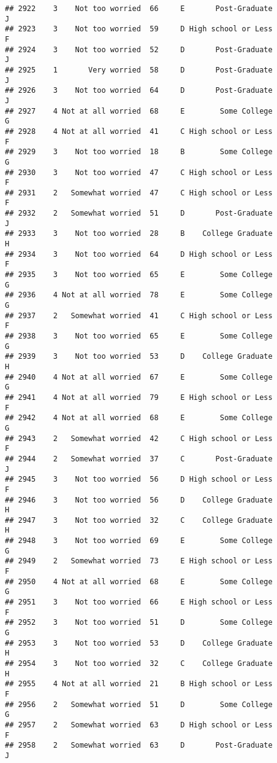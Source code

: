 \documentclass[
]{article}
\begin{document}
\begin{verbatim}
## 2922    3    Not too worried  66     E       Post-Graduate         J
## 2923    3    Not too worried  59     D High school or Less         F
## 2924    3    Not too worried  52     D       Post-Graduate         J
## 2925    1       Very worried  58     D       Post-Graduate         J
## 2926    3    Not too worried  64     D       Post-Graduate         J
## 2927    4 Not at all worried  68     E        Some College         G
## 2928    4 Not at all worried  41     C High school or Less         F
## 2929    3    Not too worried  18     B        Some College         G
## 2930    3    Not too worried  47     C High school or Less         F
## 2931    2   Somewhat worried  47     C High school or Less         F
## 2932    2   Somewhat worried  51     D       Post-Graduate         J
## 2933    3    Not too worried  28     B    College Graduate         H
## 2934    3    Not too worried  64     D High school or Less         F
## 2935    3    Not too worried  65     E        Some College         G
## 2936    4 Not at all worried  78     E        Some College         G
## 2937    2   Somewhat worried  41     C High school or Less         F
## 2938    3    Not too worried  65     E        Some College         G
## 2939    3    Not too worried  53     D    College Graduate         H
## 2940    4 Not at all worried  67     E        Some College         G
## 2941    4 Not at all worried  79     E High school or Less         F
## 2942    4 Not at all worried  68     E        Some College         G
## 2943    2   Somewhat worried  42     C High school or Less         F
## 2944    2   Somewhat worried  37     C       Post-Graduate         J
## 2945    3    Not too worried  56     D High school or Less         F
## 2946    3    Not too worried  56     D    College Graduate         H
## 2947    3    Not too worried  32     C    College Graduate         H
## 2948    3    Not too worried  69     E        Some College         G
## 2949    2   Somewhat worried  73     E High school or Less         F
## 2950    4 Not at all worried  68     E        Some College         G
## 2951    3    Not too worried  66     E High school or Less         F
## 2952    3    Not too worried  51     D        Some College         G
## 2953    3    Not too worried  53     D    College Graduate         H
## 2954    3    Not too worried  32     C    College Graduate         H
## 2955    4 Not at all worried  21     B High school or Less         F
## 2956    2   Somewhat worried  51     D        Some College         G
## 2957    2   Somewhat worried  63     D High school or Less         F
## 2958    2   Somewhat worried  63     D       Post-Graduate         J

\end{verbatim}
\end{document}
